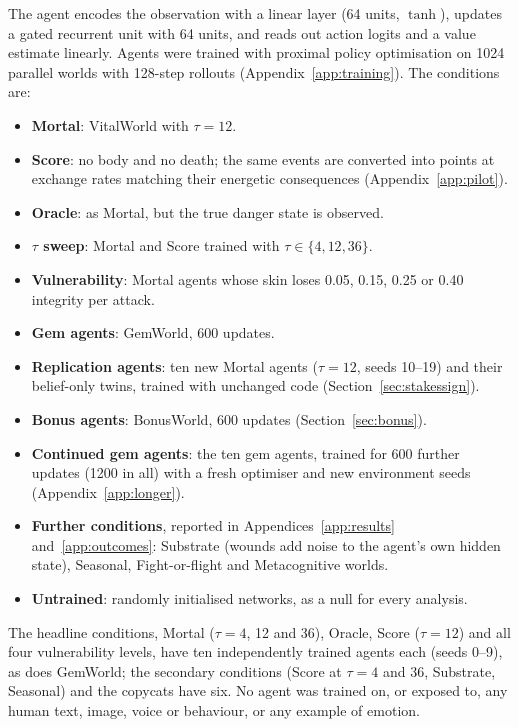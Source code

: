 \documentclass[11pt]{article}
\begin{document}
The agent encodes the observation with a linear layer (64 units, $\tanh$), updates a gated recurrent unit \cite{cho2014gru} with 64 units, and reads out action logits and a value estimate linearly. Agents were trained with proximal policy optimisation \cite{schulman2017ppo} on 1024 parallel worlds with 128-step rollouts (Appendix~\ref{app:training}). The conditions are:
\begin{itemize}
\item \textbf{Mortal}: VitalWorld with $\tau=12$.
\item \textbf{Score}: no body and no death; the same events are converted into points at exchange rates matching their energetic consequences (Appendix~\ref{app:pilot}).
\item \textbf{Oracle}: as Mortal, but the true danger state is observed.
\item \textbf{$\tau$ sweep}: Mortal and Score trained with $\tau\in\{4,12,36\}$.
\item \textbf{Vulnerability}: Mortal agents whose skin loses 0.05, 0.15, 0.25 or 0.40 integrity per attack.
\item \textbf{Gem agents}: GemWorld, 600 updates.
\item \textbf{Replication agents}: ten new Mortal agents ($\tau=12$, seeds 10--19) and their belief-only twins, trained with unchanged code (Section~\ref{sec:stakessign}).
\item \textbf{Bonus agents}: BonusWorld, 600 updates (Section~\ref{sec:bonus}).
\item \textbf{Continued gem agents}: the ten gem agents, trained for 600 further updates (1200 in all) with a fresh optimiser and new environment seeds (Appendix~\ref{app:longer}).
\item \textbf{Further conditions}, reported in Appendices~\ref{app:results} and~\ref{app:outcomes}: Substrate (wounds add noise to the agent's own hidden state), Seasonal, Fight-or-flight and Metacognitive worlds.
\item \textbf{Untrained}: randomly initialised networks, as a null for every analysis.
\end{itemize}
The headline conditions, Mortal ($\tau=4$, 12 and 36), Oracle, Score ($\tau=12$) and all four vulnerability levels, have ten independently trained agents each (seeds 0--9), as does GemWorld; the secondary conditions (Score at $\tau=4$ and 36, Substrate, Seasonal) and the copycats have six. No agent was trained on, or exposed to, any human text, image, voice or behaviour, or any example of emotion.
\end{document}

